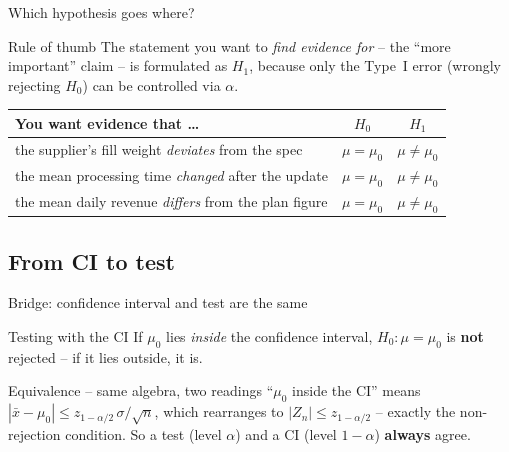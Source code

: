\documentclass[aspectratio=169,11pt]{beamer}
\begin{document}
\begin{frame}{Which hypothesis goes where?}
  \begin{block}{Rule of thumb}
    The statement you want to \emph{find evidence for} -- the ``more
    important'' claim -- is formulated as $H_1$, because only the Type~I error
    (wrongly rejecting $H_0$) can be controlled via $\alpha$.
  \end{block}
  \vspace{0.4em}
  \begin{center}
    \renewcommand{\arraystretch}{1.5}
    \begin{tabular}{@{}p{8.2cm}cc@{}}
      \toprule
      \textbf{You want evidence that \ldots} & \textbf{$H_0$} & \textbf{$H_1$}\\
      \midrule
      the supplier's fill weight \emph{deviates} from the spec
        & $\mu = \mu_0$ & $\mu \neq \mu_0$\\
      the mean processing time \emph{changed} after the update
        & $\mu = \mu_0$ & $\mu \neq \mu_0$\\
      the mean daily revenue \emph{differs} from the plan figure
        & $\mu = \mu_0$ & $\mu \neq \mu_0$\\
      \bottomrule
    \end{tabular}
  \end{center}
\end{frame}

\subsection{From CI to test}

\begin{frame}{Bridge: confidence interval and test are the same}
  \begin{block}{Testing with the CI}
    If $\mu_0$ lies \emph{inside} the confidence interval, $H_0:\mu=\mu_0$ is
    \textbf{not} rejected -- if it lies outside, it is.
  \end{block}
  \begin{block}{Equivalence -- same algebra, two readings}
    ``$\mu_0$ inside the CI'' means
    $|\bar x-\mu_0|\le z_{1-\alpha/2}\,\sigma/\sqrt n$, which rearranges to
    $|Z_n|\le z_{1-\alpha/2}$ -- exactly the non-rejection condition. So a
    test (level $\alpha$) and a CI (level $1-\alpha$) \textbf{always} agree.
  \end{block}
\end{frame}
\end{document}
